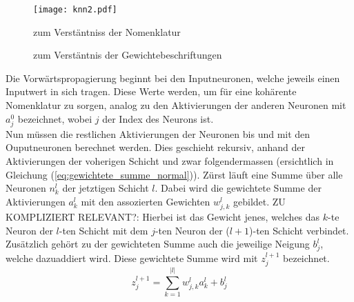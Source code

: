 \begin{figure}[h!]
  \centering
  \texttt{[image: knn2.pdf]}
  \caption{zum Verstäntniss der Nomenklatur}
  \label{fig:nomenklatur1}
\end{figure}
\para{}
\begin{figure}[h!]
  \centering
  \caption{zum Verstäntnis der Gewichtebeschriftungen}
  \label{fig:nomenklatur2}
\end{figure}
\para{}
Die Vorwärtspropagierung beginnt bei den Inputneuronen, welche jeweils
einen Inputwert in sich tragen. Diese Werte werden, um für eine kohärente Nomenklatur zu sorgen,
analog zu den Aktivierungen der anderen Neuronen mit $a_j^0$ bezeichnet, wobei
$j$ der Index des Neurons ist. \\
Nun müssen die restlichen Aktivierungen der Neuronen bis und mit den Ouputneuronen berechnet werden. Dies geschieht rekursiv, anhand der
Aktivierungen der voherigen Schicht und zwar folgendermassen (ersichtlich in
Gleichung (\ref{eq:gewichtete_summe_normal})).
\para{}
Zürst läuft eine Summe über alle Neuronen $n_k^{l}$ der jetztigen Schicht
$l$. Dabei wird die gewichtete Summe der Aktivierungen $a_k^{l}$ mit den
assozierten Gewichten $w_{j,k}^l$ gebildet. ZU KOMPLIZIERT RELEVANT?: Hierbei ist das Gewicht jenes, welches das
$k$-te Neuron der $l$-ten Schicht mit dem $j$-ten Neuron der ($l+1$)-ten Schicht verbindet.
Zusätzlich gehört zu der gewichteten Summe auch die jeweilige Neigung $b_j^l$, welche
dazuaddiert wird. Diese gewichtete Summe wird mit $z_j^{l+1}$ bezeichnet.
\\
\begin{equation}\tag{FP1}\label{eq:gewichtete_summe_normal}
  z_j^{l+1} = \sum_{k=1}^{|l|} w_{j,k}^l a_k^l + b_j^l
\end{equation}
\\

